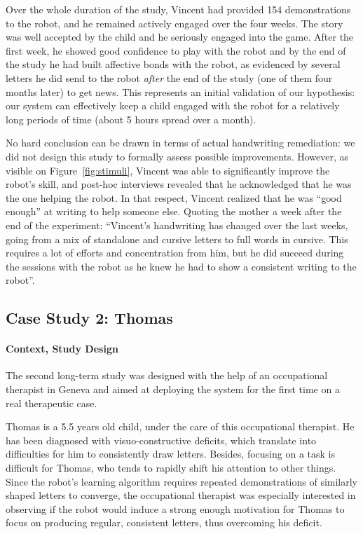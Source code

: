 \documentclass{article}
\begin{document}
Over the whole duration of the study, Vincent had provided 154 demonstrations to the robot, and he remained
actively engaged over the four weeks. The story was well accepted by the child and
he seriously engaged into the game. After the first week, he showed good
confidence to play with the robot and by the end of the study he had built
affective bonds with the robot, as evidenced by several letters he did send to the
robot \emph{after} the end of the study (one of them four months later) to get
news. This represents an initial validation of our hypothesis: our system can effectively keep a
child engaged with the robot for a relatively long periods of time (about 5
hours spread over a month).

No hard conclusion can be drawn in terms of actual handwriting remediation: we did
not design this study to formally assess possible improvements. However, as
visible on Figure~\ref{fig:stimuli}, Vincent was able to significantly improve
the robot's skill, and post-hoc interviews revealed that he acknowledged that he
was the one helping the robot. In that respect, Vincent realized that he was
``good enough'' at writing to help someone else. Quoting the mother a week
after the end of the experiment: ``Vincent's handwriting has changed over the
last weeks, going from a mix of standalone and cursive letters to full words in
cursive. This requires a lot of efforts and concentration from him, but he did
succeed during the sessions with the robot as he knew he had to show a
consistent writing to the robot''.


\subsection{Case Study 2: Thomas}

\paragraph{Context, Study Design}

The second long-term study was designed with the help of an occupational therapist in
Geneva and aimed at deploying the system for the first time on a real
therapeutic case.

Thomas is a 5.5 years old child, under the care of this occupational therapist. He
has been diagnosed with visuo-constructive deficits, which translate into
difficulties for him to consistently draw letters. Besides, focusing on a task
is difficult for Thomas, who tends to rapidly shift his attention to other
things. Since the robot's learning algorithm requires repeated demonstrations of
similarly shaped letters to converge, the occupational therapist was especially
interested in observing if the robot would induce a strong enough motivation for
Thomas to focus on producing regular, consistent letters, thus overcoming his
deficit.
\end{document}
